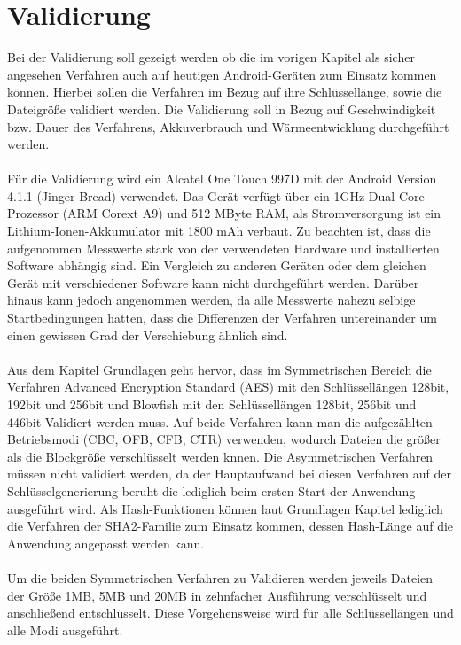 \documentclass[10pt, a4paper,headsepline]{scrreprt}
\begin{document}
\chapter{Validierung}
Bei der Validierung soll gezeigt werden ob die im vorigen Kapitel als sicher angesehen Verfahren auch auf heutigen Android-Geräten zum Einsatz kommen können. Hierbei sollen die Verfahren im Bezug auf ihre Schlüssellänge, sowie die Dateigröße validiert werden. Die Validierung soll in Bezug auf Geschwindigkeit bzw. Dauer des Verfahrens, Akkuverbrauch und Wärmeentwicklung durchgeführt werden.  \\ \\
Für die Validierung wird ein Alcatel One Touch 997D mit der Android Version 4.1.1 (Jinger Bread) verwendet. Das Gerät verfügt über ein 1GHz Dual Core Prozessor (ARM Corext A9) und 512 MByte RAM, als Stromversorgung ist ein Lithium-Ionen-Akkumulator mit 1800 mAh verbaut. Zu  beachten ist, dass die aufgenommen Messwerte stark von der verwendeten Hardware und installierten Software abhängig sind. Ein Vergleich zu anderen Geräten oder dem gleichen Gerät mit verschiedener Software kann nicht durchgeführt werden. Darüber hinaus kann jedoch angenommen werden, da alle Messwerte nahezu selbige Startbedingungen hatten, dass die Differenzen der Verfahren untereinander um einen gewissen Grad der Verschiebung ähnlich sind.\\ \\
Aus dem Kapitel Grundlagen geht hervor, dass im Symmetrischen Bereich die Verfahren Advanced Encryption Standard (AES) mit den Schlüssellängen 128bit, 192bit und 256bit und Blowfish mit den Schlüssellängen 128bit, 256bit und 446bit Validiert werden muss. Auf beide Verfahren kann man die aufgezählten Betriebsmodi (CBC, OFB, CFB, CTR) verwenden, wodurch Dateien die größer als die Blockgröße verschlüsselt werden knnen. Die Asymmetrischen Verfahren müssen nicht validiert werden, da der Hauptaufwand bei diesen Verfahren auf der Schlüsselgenerierung beruht die lediglich beim ersten Start der Anwendung ausgeführt wird. Als Hash-Funktionen können laut Grundlagen Kapitel lediglich die Verfahren der SHA2-Familie zum Einsatz kommen, dessen Hash-Länge auf die Anwendung angepasst werden kann. \\ \\
Um die beiden Symmetrischen Verfahren zu Validieren werden jeweils Dateien der Größe 1MB, 5MB und 20MB in zehnfacher Ausführung verschlüsselt und anschließend entschlüsselt. Diese Vorgehensweise wird für alle Schlüssellängen und alle Modi ausgeführt. \\
\end{document}
